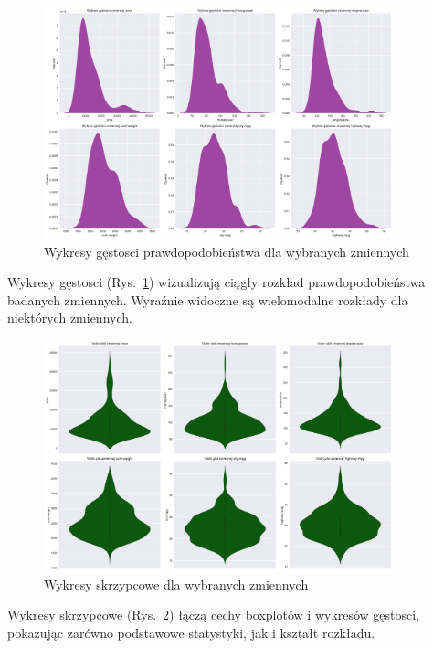 \documentclass[12pt,a4paper]{article}
\begin{document}
\begin{figure}[H]
    \centering
    \includegraphics[width=0.9\textwidth]{figures/density_plots.png}
    \caption{Wykresy gęstosci prawdopodobieństwa dla wybranych zmiennych}
    \label{fig:density_plots}
\end{figure}

Wykresy gęstosci (Rys.~\ref{fig:density_plots}) wizualizują ciągły rozkład prawdopodobieństwa badanych zmiennych. Wyraźnie widoczne są wielomodalne rozkłady dla niektórych zmiennych.

\begin{figure}[H]
    \centering
    \includegraphics[width=0.9\textwidth]{figures/violin_plots.png}
    \caption{Wykresy skrzypcowe dla wybranych zmiennych}
    \label{fig:violin_plots}
\end{figure}

Wykresy skrzypcowe (Rys.~\ref{fig:violin_plots}) łączą cechy boxplotów i wykresów gęstosci, pokazując zarówno podstawowe statystyki, jak i kształt rozkładu.
\end{document}

